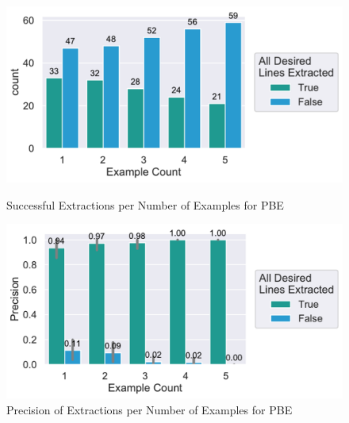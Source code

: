 \documentclass[\myrootdir/main.tex]{subfiles}
\begin{document}
\begin{figure}[htbp]
	\centering
	\begin{minipage}{0.45\textwidth}
		\centering
		\includegraphics[width=\textwidth, clip]{img/big-study/success-examples-PBE.pdf}
		\caption{Successful Extractions per Number of Examples for PBE}
		\label{fig:success-examples-pbe}
	\end{minipage}\hfill
	\begin{minipage}{0.45\textwidth}
		\centering
		\includegraphics[width=\textwidth, clip]{img/big-study/precision-PBE.pdf}
		\caption{Precision of Extractions per Number of Examples for PBE}
		\label{fig:precision-pbe}
	\end{minipage}
\end{figure}
\end{document}
